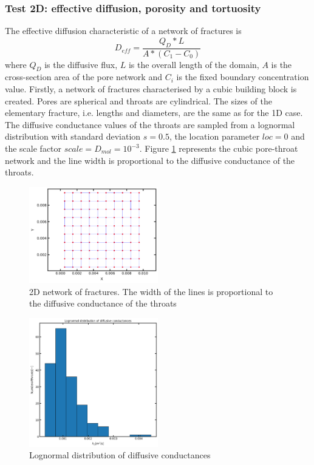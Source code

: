 \documentclass{article}
\begin{document}
\FloatBarrier  %
\subsubsection{Test 2D: effective diffusion, porosity and tortuosity}
The effective diffusion characteristic of a network of fractures is
\begin{equation}
    D_{eff}=\frac{Q_D*L}{A*(C_1-C_0)}
    \label{eq:EffDiff}
\end{equation}
where $Q_D$ is the diffusive flux, $L$ is the overall length of the domain, $A$ is the cross-section area of the pore network and $C_i$ is the fixed boundary concentration value.
Firstly, a network of fractures characterised by a cubic building block is created. Pores are spherical and throats are cylindrical. The sizes of the elementary fracture, i.e. lengths and diameters, are the same as for the 1D case. The diffusive conductance values of the throats are sampled from a lognormal distribution with standard deviation $s=0.5$, the location parameter $loc=0$ and the scale factor $scale=D_{mol}=10^{-3}$. Figure \ref{fig:Network} represents the cubic pore-throat network and the line width is proportional to the diffusive conductance of the throats.
\FloatBarrier  %
\begin{figure}[h]
    \centering
    \includegraphics[width=0.5\textwidth]{images/fromOpenPNM/rectangular2Dpn.png}
    \caption{2D network of fractures. The width of the lines is proportional to the diffusive conductance of the throats}
    \label{fig:Network}
\end{figure}
\FloatBarrier  %
\begin{figure}[h]
    \centering
    \includegraphics[width=0.5\textwidth]{images/fromOpenPNM/effDiffLognormalDist.png}
    \caption{Lognormal distribution of diffusive conductances}
    \label{fig:LogDiff}
\end{figure}
\end{document}
